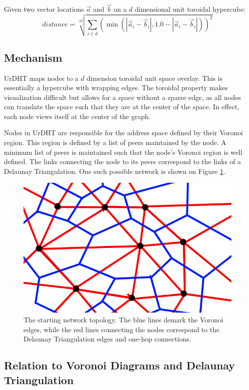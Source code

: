 Given two vector locations $\vec{a}$ and $\vec{b}$ on a  $d$ dimensional unit toroidal hypercube:
\[ distance = \sqrt[|d|]{\sum\limits_{i\in d} (\min(|\vec{a}_i-\vec{b}_i|,1.0-|\vec{a}_i-\vec{b}_i|))^2}\]

\subsection{Mechanism}
UrDHT maps nodes to a $d$ dimension toroidal unit space overlay. This is essentially a hypercube with wrapping edges. The toroidal property makes visualization difficult but allows for a space without a sparse edge, as all nodes can translate the space such that they are at the center of the space.  In effect, each node views itself at the center of the graph.

Nodes in UrDHT are responsible for the address space defined by their Voronoi region. This region is defined by a list of peers maintained by the node. A minimum list of peers is maintained such that the node's Voronoi region is well defined. The links connecting the node to its peers correspond to the links of a Delaunay Triangulation.  One such possible network is shown on Figure \ref{fig:churninit}.


\begin{figure}
	\includegraphics[width=\linewidth]{figs/voronoi-churn2}
	\caption{The starting network topology.  The blue lines demark the Voronoi edges, while the red lines connecting the nodes correspond to the Delaunay Triangulation edges and one-hop connections.}
	\label{fig:churninit}
\end{figure}

\subsection{Relation to Voronoi Diagrams and Delaunay Triangulation}

